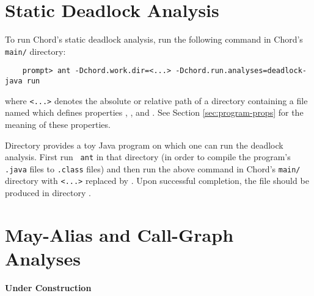 \section{Static Deadlock Analysis}

To run Chord's static deadlock analysis,  run the following
command in Chord's {\tt main/} directory:

\begin{verbatim}
    prompt> ant -Dchord.work.dir=<...> -Dchord.run.analyses=deadlock-java run
\end{verbatim}

where {\tt <...>} denotes the absolute or relative path of a directory
containing a file named  which defines
properties , , and
.  See Section \ref{sec:program-props} for the
meaning of these properties.

Directory  provides a toy Java
program on which one can run the deadlock analysis.  First run {\tt
  ant} in that directory (in order to compile the program's {\tt
  .java} files to {\tt .class} files) and then run the above command
in Chord's {\tt main/} directory with {\tt <...>} replaced by
.  Upon successful completion, the
file  should be produced in directory
.

\section{May-Alias and Call-Graph Analyses}

{\bf Under Construction}
